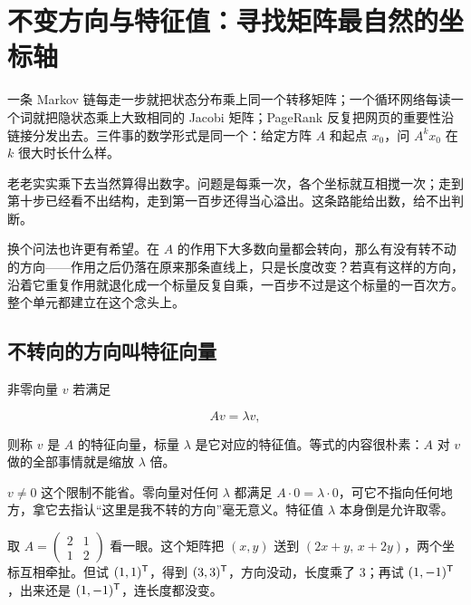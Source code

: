\section{不变方向与特征值：寻找矩阵最自然的坐标轴}
\label{sec:03-Linear-Algebra/05-Eigenvalues-and-Eigenvectors/01}

一条 Markov 链每走一步就把状态分布乘上同一个转移矩阵；一个循环网络每读一个词就把隐状态乘上大致相同的 Jacobi 矩阵；PageRank 反复把网页的重要性沿链接分发出去。三件事的数学形式是同一个：给定方阵 \(A\) 和起点 \(x_0\)，问 \(A^k x_0\) 在 \(k\) 很大时长什么样。

老老实实乘下去当然算得出数字。问题是每乘一次，各个坐标就互相搅一次；走到第十步已经看不出结构，走到第一百步还得当心溢出。这条路能给出数，给不出判断。

换个问法也许更有希望。在 \(A\) 的作用下大多数向量都会转向，那么有没有转不动的方向——作用之后仍落在原来那条直线上，只是长度改变？若真有这样的方向，沿着它重复作用就退化成一个标量反复自乘，一百步不过是这个标量的一百次方。整个单元都建立在这个念头上。

\subsection{不转向的方向叫特征向量}

非零向量 \(v\) 若满足

\[
Av = \lambda v,
\]

则称 \(v\) 是 \(A\) 的特征向量，标量 \(\lambda\) 是它对应的特征值。等式的内容很朴素：\(A\) 对 \(v\) 做的全部事情就是缩放 \(\lambda\) 倍。

\(v\neq 0\) 这个限制不能省。零向量对任何 \(\lambda\) 都满足 \(A\cdot 0=\lambda\cdot 0\)，可它不指向任何地方，拿它去指认``这里是我不转的方向''毫无意义。特征值 \(\lambda\) 本身倒是允许取零。

取 \(A=\begin{pmatrix}2&1\\1&2\end{pmatrix}\) 看一眼。这个矩阵把 \((x,y)\) 送到 \((2x+y,\,x+2y)\)，两个坐标互相牵扯。但试 \((1,1)^{\mathsf{T}}\)，得到 \((3,3)^{\mathsf{T}}\)，方向没动，长度乘了 \(3\)；再试 \((1,-1)^{\mathsf{T}}\)，出来还是 \((1,-1)^{\mathsf{T}}\)，连长度都没变。

